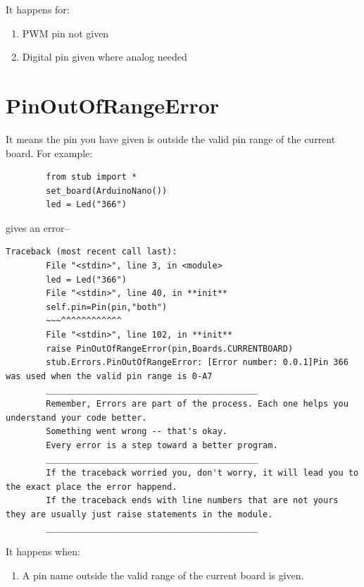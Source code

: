 	It happens for: 
	\begin{enumerate} 
		\item PWM pin not given 
		\item Digital pin given where analog needed 
	\end{enumerate} 
	\newpage 
	
	\section{PinOutOfRangeError} 
	It means the pin you have given is outside the valid pin range of the current board. For example: 
	\begin{lstlisting} 
		from stub import * 
		set_board(ArduinoNano()) 
		led = Led("366") 
	\end{lstlisting} 
	gives an error-- 
	\begin{lstlisting}[style=tracebacks] 
		Traceback (most recent call last): 
		File "<stdin>", line 3, in <module> 
		led = Led("366") 
		File "<stdin>", line 40, in **init** 
		self.pin=Pin(pin,"both") 
		~~~^^^^^^^^^^^^ 
		File "<stdin>", line 102, in **init** 
		raise PinOutOfRangeError(pin,Boards.CURRENTBOARD) 
		stub.Errors.PinOutOfRangeError: [Error number: 0.0.1]Pin 366 was used when the valid pin range is 0-A7 
		__________________________________________ 
		Remember, Errors are part of the process. Each one helps you understand your code better. 
		Something went wrong -- that's okay. 
		Every error is a step toward a better program. 
		__________________________________________ 
		If the traceback worried you, don't worry, it will lead you to the exact place the error happend. 
		If the traceback ends with line numbers that are not yours they are usually just raise statements in the module. 
		__________________________________________ 
	\end{lstlisting} 
	
	
	It happens when: 
	\begin{enumerate} 
		\item A pin name outside the valid range of the current board is given. 
	\end{enumerate} 
	\newpage 
	
